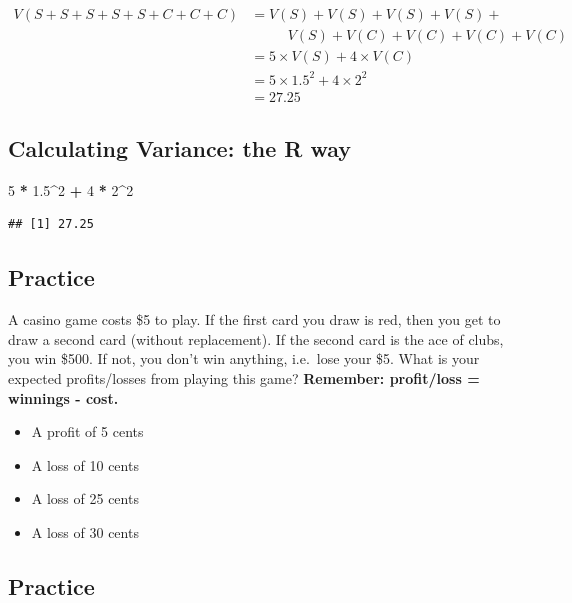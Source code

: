 \documentclass[
]{article}
\newenvironment{Shaded}{\begin{snugshade}}{\end{snugshade}}
\newcommand{\DecValTok}[1]{\textcolor[rgb]{0.00,0.00,0.81}{#1}}
\newcommand{\FloatTok}[1]{\textcolor[rgb]{0.00,0.00,0.81}{#1}}
\newcommand{\OperatorTok}[1]{\textcolor[rgb]{0.81,0.36,0.00}{\textbf{#1}}}
\newcommand{\StringTok}[1]{\textcolor[rgb]{0.31,0.60,0.02}{#1}}
\providecommand{\tightlist}{%
  \setlength{\itemsep}{0pt}\setlength{\parskip}{0pt}}
\begin{document}
\[
\begin{split}
V(S+S+S+S+S+C+C+C) &= V(S) + V(S) + V(S) + V(S) + \\ &\phantom{==}V(S) + V(C) + V(C) + V(C) + V(C) \\
&= 5 \times V(S) + 4 \times V(C) \\
&= 5 \times 1.5^2 + 4 \times 2^2 \\
&= 27.25
\end{split}
\]

\hypertarget{calculating-variance-the-r-way}{%
\subsection{Calculating Variance: the R
way}\label{calculating-variance-the-r-way}}

\begin{Shaded}
\begin{Highlighting}[]
\DecValTok{5} \OperatorTok{*}\StringTok{ }\FloatTok{1.5}\OperatorTok{^}\DecValTok{2} \OperatorTok{+}\StringTok{ }\DecValTok{4} \OperatorTok{*}\StringTok{ }\DecValTok{2}\OperatorTok{^}\DecValTok{2}
\end{Highlighting}
\end{Shaded}

\begin{verbatim}
## [1] 27.25
\end{verbatim}

\hypertarget{practice}{%
\subsection{Practice}\label{practice}}

A casino game costs \$5 to play. If the first card you draw is red, then
you get to draw a second card (without replacement). If the second card
is the ace of clubs, you win \$500. If not, you don't win anything,
i.e.~lose your \$5. What is your expected profits/losses from playing
this game? \textbf{{Remember: profit/loss = winnings - cost.}}

\begin{itemize}
\tightlist
\item
  A profit of 5 cents
\item
  A loss of 10 cents
\item
  A loss of 25 cents
\item
  A loss of 30 cents
\end{itemize}

\hypertarget{practice-1}{%
\subsection{Practice}\label{practice-1}}
\end{document}
